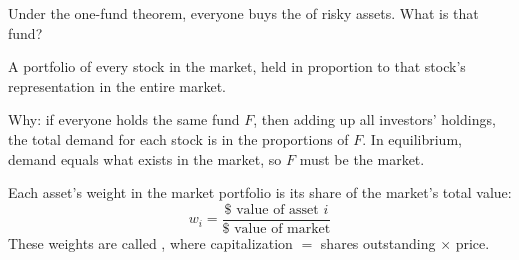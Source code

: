 

Under the one-fund theorem, everyone buys the  of risky assets. What is that fund?
\begin{definition}
    A portfolio of every stock in the market, held in proportion to that stock's representation in the entire market.
\end{definition}
Why: if everyone holds the same fund $F$, then adding up all investors' holdings, the total demand for each stock is in the proportions of $F$. In equilibrium, demand equals what exists in the market, so $F$ must be the market.

Each asset's weight in the market portfolio is its share of the market's total value:
\[\boxed{w_i = \frac{\$\text{ value of asset } i}{\$\text{ value of market}}}\]
These weights are called , where capitalization $=$ shares outstanding $\times$ price.

